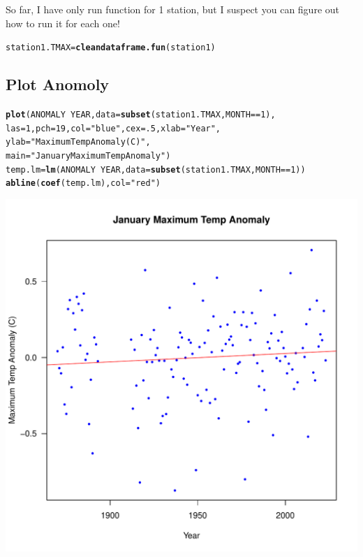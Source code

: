 \documentclass{article}\usepackage[]{graphicx}\usepackage[]{xcolor}
\makeatletter
\def\maxwidth{ %
  \ifdim\Gin@nat@width>\linewidth
    \linewidth
  \else
    \Gin@nat@width
  \fi
}
\newcommand{\hlnum}[1]{\textcolor[rgb]{0.686,0.059,0.569}{#1}}%
\newcommand{\hlstr}[1]{\textcolor[rgb]{0.192,0.494,0.8}{#1}}%
\newcommand{\hlopt}[1]{\textcolor[rgb]{0,0,0}{#1}}%
\newcommand{\hlstd}[1]{\textcolor[rgb]{0.345,0.345,0.345}{#1}}%
\newcommand{\hlkwb}[1]{\textcolor[rgb]{0.69,0.353,0.396}{#1}}%
\newcommand{\hlkwc}[1]{\textcolor[rgb]{0.333,0.667,0.333}{#1}}%
\newcommand{\hlkwd}[1]{\textcolor[rgb]{0.737,0.353,0.396}{\textbf{#1}}}%
\newenvironment{kframe}{%
 \def\at@end@of@kframe{}%
 \ifinner\ifhmode%
  \def\at@end@of@kframe{\end{minipage}}%
  \begin{minipage}{\columnwidth}%
 \fi\fi%
 \def\FrameCommand##1{\hskip\@totalleftmargin \hskip-\fboxsep
 \colorbox{shadecolor}{##1}\hskip-\fboxsep
     \hskip-\linewidth \hskip-\@totalleftmargin \hskip\columnwidth}%
 \MakeFramed {\advance\hsize-\width
   \@totalleftmargin\z@ \linewidth\hsize
   \@setminipage}}%
 {\par\unskip\endMakeFramed%
 \at@end@of@kframe}
\newenvironment{knitrout}{}{} %
\makeatother
\begin{document}
So far, I have only run function for 1 station, but I suspect you can figure out how to run it for each one!

\begin{knitrout}
\color{fgcolor}\begin{kframe}
\begin{alltt}
\hlstd{station1.TMAX} \hlkwb{=} \hlkwd{cleandataframe.fun}\hlstd{(station1)}
\end{alltt}
\end{kframe}
\end{knitrout}

\subsection{Plot Anomoly}

\begin{knitrout}
\color{fgcolor}\begin{kframe}
\begin{alltt}
\hlkwd{plot}\hlstd{(ANOMALY} \hlopt{~} \hlstd{YEAR,} \hlkwc{data} \hlstd{=} \hlkwd{subset}\hlstd{(station1.TMAX, MONTH} \hlopt{==} \hlnum{1}\hlstd{),}
     \hlkwc{las}\hlstd{=}\hlnum{1}\hlstd{,} \hlkwc{pch}\hlstd{=}\hlnum{19}\hlstd{,} \hlkwc{col} \hlstd{=} \hlstr{"blue"}\hlstd{,} \hlkwc{cex}\hlstd{=}\hlnum{.5}\hlstd{,} \hlkwc{xlab} \hlstd{=} \hlstr{"Year"}\hlstd{,}
     \hlkwc{ylab} \hlstd{=} \hlstr{"Maximum Temp Anomaly (C)"}\hlstd{,}
     \hlkwc{main}\hlstd{=}\hlstr{"January Maximum Temp Anomaly"}\hlstd{)}
\hlstd{temp.lm} \hlkwb{=} \hlkwd{lm}\hlstd{(ANOMALY} \hlopt{~} \hlstd{YEAR,} \hlkwc{data} \hlstd{=} \hlkwd{subset}\hlstd{(station1.TMAX, MONTH} \hlopt{==} \hlnum{1}\hlstd{))}
\hlkwd{abline}\hlstd{(}\hlkwd{coef}\hlstd{(temp.lm),} \hlkwc{col} \hlstd{=} \hlstr{"red"}\hlstd{)}
\end{alltt}
\end{kframe}
\includegraphics[width=\maxwidth]{figure/unnamed-chunk-8-1} 
\end{knitrout}
\end{document}
